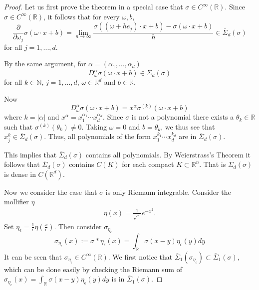 \begin{proof}
Let us first prove the theorem in a special case that $\sigma\in
C^\infty(\mathbb{R})$.
Since $\sigma\in C^\infty(\mathbb{R})$, it follows that for every $\omega,b$,
\begin{equation}
 \frac{\partial}{\partial \omega_j}\sigma(\omega\cdot x+b) = 
 \lim_{n\rightarrow \infty}\frac{\sigma((\omega+h e_j)\cdot x+b)-\sigma(\omega\cdot x+b)}{h} \in \overline{\Sigma}_d(\sigma)
\end{equation}
for all $j=1,...,d$. 

By the same argument, for $\alpha = (\alpha_1,...,\alpha_d)$
$$D^\alpha_\omega\sigma(\omega\cdot x+b)\in\overline{\Sigma}_d(\sigma)$$
for all $k\in\mathbb{N}$, $j=1,...,d$, $\omega\in\mathbb{R}^d$ and $b\in\mathbb{R}$.

Now 
$$
D^\alpha_\omega\sigma(\omega\cdot x+b)=x^\alpha\sigma^{(k)}(\omega\cdot x+b)
$$
where $k=|\alpha|$ and $x^\alpha = x_1^{\alpha_1}\cdots x_d^{\alpha_d}$.  Since
$\sigma$ is not a polynomial there exists a $\theta_k\in\mathbb{R}$
such that $\sigma^{(k)}(\theta_k)\ne0$.  Taking $\omega=0$ and
$b=\theta_k$, we thus see that $x_j^k\in\overline{\Sigma}_d(\sigma)$.
Thus, all polynomials of the form $x_1^{k_1}\cdots x_d^{k_d}$ are in
$\overline{\Sigma}_d(\sigma)$.

This implies that $\overline{\Sigma}_d(\sigma)$ contains all
polynomials.  By Weierstrass's Theorem \cite{stone1948generalized} it
follows that $\overline{\Sigma}_d(\sigma)$ contains $C(K)$ for each
compact $K\subset\mathbb{R}^n$. That is $\Sigma_d(\sigma)$ is dense in
$C(\mathbb{R}^d)$.

Now we consider the case that $\sigma$ is only Riemann integrable. 
Consider the mollifier $\eta$
	\begin{equation*}
	\begin{aligned}
	\eta(x)=\frac{1}{\sqrt {\pi}}e^{-x^2}.
	\end{aligned}
	\end{equation*}
Set $\eta_\epsilon=\frac{1}{\epsilon}\eta(\frac{x}{\epsilon})$. Then consider $\sigma_{\eta_\epsilon}$
\begin{equation}
\sigma_{\eta_\epsilon}(x):=\sigma\ast{\eta_\epsilon}(x)=\int_{\mathbb{R}}\sigma(x-y){\eta_\epsilon}(y)dy
\end{equation}
It can be seen that $\sigma_{\eta_\epsilon}\in C^\infty(\mathbb{R})$.
We first notice that
$\overline{\Sigma}_1(\sigma_{\eta_\epsilon})\subset\overline{\Sigma}_1(\sigma)$,
which can be done easily by checking the Riemann sum of
$\sigma_{\eta_\epsilon}(x)=\int_{\mathbb{R}}\sigma(x-y){\eta_\epsilon}(y)dy$
is in $\overline{\Sigma}_1(\sigma)$.


\end{proof}

